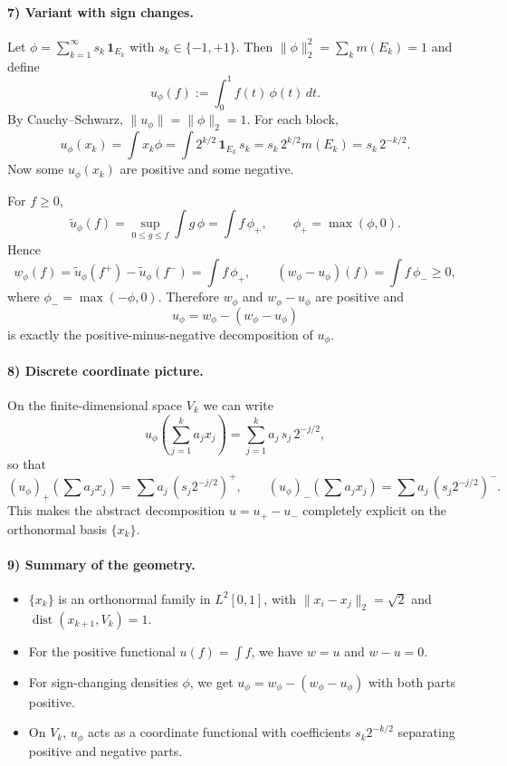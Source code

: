 \documentclass[12pt,a4paper]{article}
\theoremstyle{plain}
\theoremstyle{definition}
\theoremstyle{remark}
\theoremstyle{remark}
\theoremstyle{definition}
\begin{document}
	\bigskip
	
	\paragraph{7) Variant with sign changes.}
	Let $\phi=\sum_{k=1}^\infty s_k\,\mathbf 1_{E_k}$ with $s_k\in\{-1,+1\}$.
	Then $\|\phi\|_2^2=\sum_k m(E_k)=1$ and define
	\[
	u_\phi(f):=\int_0^1 f(t)\,\phi(t)\,dt.
	\]
	By Cauchy--Schwarz, $\|u_\phi\|=\|\phi\|_2=1$.
	For each block,
	\[
	u_\phi(x_k)
	= \int x_k\phi
	= \int 2^{k/2}\,\mathbf 1_{E_k}\,s_k
	= s_k\,2^{k/2}m(E_k)
	= s_k\,2^{-k/2}.
	\]
	Now some $u_\phi(x_k)$ are positive and some negative.
	
	For $f\ge0$,
	\[
	\tilde u_\phi(f)
	= \sup_{0\le g\le f}\int g\,\phi
	= \int f\,\phi_{+},
	\qquad \phi_{+}=\max(\phi,0).
	\]
	Hence
	\[
	w_\phi(f)
	= \tilde u_\phi(f^+) - \tilde u_\phi(f^-)
	= \int f\,\phi_{+},
	\qquad
	(w_\phi - u_\phi)(f)
	= \int f\,\phi_{-} \ge 0,
	\]
	where $\phi_-=\max(-\phi,0)$.
	Therefore $w_\phi$ and $w_\phi-u_\phi$ are positive and
	\[
	u_\phi = w_\phi - (w_\phi - u_\phi)
	\]
	is exactly the positive-minus-negative decomposition of $u_\phi$.
	
	\bigskip
	
	\paragraph{8) Discrete coordinate picture.}
	On the finite-dimensional space $V_k$ we can write
	\[
	u_\phi\!\left(\sum_{j=1}^{k} a_j x_j\right)
	= \sum_{j=1}^{k} a_j\,s_j\,2^{-j/2},
	\]
	so that
	\[
	(u_\phi)_+\!\left(\sum a_j x_j\right)
	= \sum a_j\,(s_j 2^{-j/2})^{+},
	\qquad
	(u_\phi)_-\!\left(\sum a_j x_j\right)
	= \sum a_j\,(s_j 2^{-j/2})^{-}.
	\]
	This makes the abstract decomposition $u=u_+-u_-$ completely explicit
	on the orthonormal basis $\{x_k\}$.
	
	\bigskip
	
	\paragraph{9) Summary of the geometry.}
	\begin{itemize}
		\item $\{x_k\}$ is an orthonormal family in $L^2[0,1]$,
		with $\|x_i-x_j\|_2=\sqrt{2}$ and
		$\operatorname{dist}(x_{k+1},V_k)=1$.
		\item For the positive functional $u(f)=\int f$, we have $w=u$ and $w-u=0$.
		\item For sign-changing densities $\phi$, we get
		$u_\phi=w_\phi-(w_\phi-u_\phi)$ with both parts positive.
		\item On $V_k$, $u_\phi$ acts as a coordinate functional with
		coefficients $s_k 2^{-k/2}$ separating positive and negative parts.
	\end{itemize}
	
\end{document}

